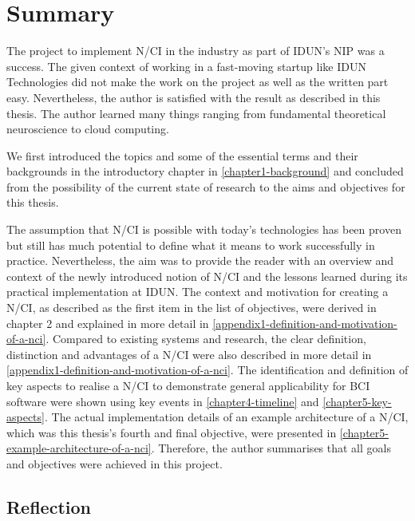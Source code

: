 \section{Summary}
\label{chapter5-summary}

The project to implement N/CI in the industry as part of IDUN's NIP was a success. The given context of working in a fast-moving startup like IDUN Technologies did not make the work on the project as well as the written part easy. Nevertheless, the author is satisfied with the result as described in this thesis. The author learned many things ranging from fundamental theoretical neuroscience to cloud computing.

We first introduced the topics and some of the essential terms and their backgrounds in the introductory chapter in \autoref{chapter1-background} and concluded from the possibility of the current state of research to the aims and objectives for this thesis.

The assumption that N/CI is possible with today's technologies has been proven but still has much potential to define what it means to work successfully in practice. Nevertheless, the aim was to provide the reader with an overview and context of the newly introduced notion of N/CI and the lessons learned during its practical implementation at IDUN. The context and motivation for creating a N/CI, as described as the first item in the list of objectives, were derived in chapter 2 and explained in more detail in \autoref{appendix1-definition-and-motivation-of-a-nci}. Compared to existing systems and research, the clear definition, distinction and advantages of a N/CI were also described in more detail in \autoref{appendix1-definition-and-motivation-of-a-nci}. The identification and definition of key aspects to realise a N/CI to demonstrate general applicability for BCI software were shown using key events in \autoref{chapter4-timeline} and \autoref{chapter5-key-aspects}. The actual implementation details of an example architecture of a N/CI, which was this thesis's fourth and final objective, were presented in \autoref{chapter5-example-architecture-of-a-nci}. Therefore, the author summarises that all goals and objectives were achieved in this project.

\subsection{Reflection}
\label{chapter5-reflection}

